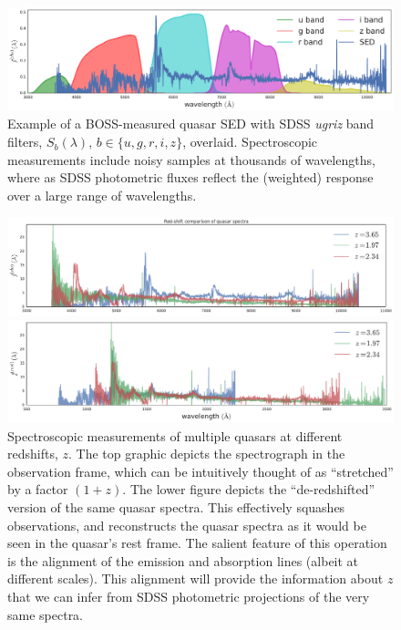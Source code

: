 \documentclass{article}
\begin{document}
\begin{figure}[ht]
\vskip 0.2in
\begin{center}
\centerline{\includegraphics[width=2\columnwidth]{../figs/quasar_spectrum_sdss_filters}}
\caption{Example of a BOSS-measured quasar SED with SDSS \emph{ugriz} band filters, $S_{b}(\lambda)$, $b \in \{u, g, r, i, z\}$, overlaid.  Spectroscopic measurements include noisy samples at thousands of wavelengths, where as SDSS photometric fluxes reflect the (weighted) response over a large range of wavelengths.}
\label{fig:filters}
\end{center}
\vskip -0.2in
\end{figure} 


\begin{figure}[ht]
\vskip 0.2in
\begin{center}
\centerline{\includegraphics[width=2\columnwidth]{../figs/quasar_redshift_obs_frame}}
\centerline{\includegraphics[width=2\columnwidth]{../figs/quasar_redshift_rest_frame}}
\caption{Spectroscopic measurements of multiple quasars at different redshifts, $z$.  The top graphic depicts the spectrograph in the observation frame, which can be intuitively thought of as ``stretched'' by a factor $(1+z)$.  The lower figure depicts the ``de-redshifted'' version of the same quasar spectra.  This effectively squashes observations, and reconstructs the quasar spectra as it would be seen in the quasar's rest frame.  The salient feature of this operation is the alignment of the emission and absorption lines (albeit at different scales).  This alignment will provide the information about $z$ that we can infer from SDSS photometric projections of the very same spectra.}
\label{fig:frames}
\end{center}
\vskip -0.2in
\end{figure} 
\end{document}
